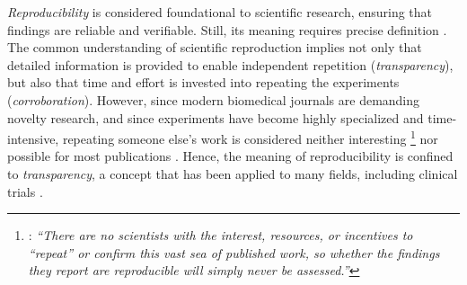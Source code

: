 \emph{Reproducibility} is considered foundational to scientific research, ensuring that
findings are reliable and verifiable. Still, its meaning requires precise
definition \cite{goodmanWhatDoesResearch2016}. The common understanding of
scientific reproduction implies not only that detailed information is provided
to enable independent repetition (\emph{transparency}), but also that time and
effort is invested into repeating the experiments (\emph{corroboration}).
However, since modern biomedical journals are demanding novelty research, and
since experiments have become highly specialized and time-intensive, repeating
someone else's work is considered neither interesting%
\footnote{%
    \citet{flierProblemIrreproducibleBioscience2022}: \textit{``There are no
        scientists with the interest, resources, or incentives to “repeat” or
        confirm this vast sea of published work, so whether the findings they
        report are reproducible will simply never be assessed.''} } %
nor possible for most publications \cite{flierProblemIrreproducibleBioscience2022,
    pengReproducibleResearchComputational2011}. Hence, the meaning of
reproducibility is confined to \emph{transparency}, a concept that has
been applied to many fields, including clinical trials
\cite{goodmanWhatDoesResearch2016,
    committeeonstrategiesforresponsiblesharingofclinicaltrialdataSharingClinicalTrial2015}.

